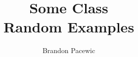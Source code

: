 \documentclass{report}
\title{\Huge{Some Class}\\Random Examples}
\author{\huge{Brandon Pacewic}}
\date{}
\begin{document}
\maketitle
\newpage
\tableofcontents
\pagebreak

\end{document}
